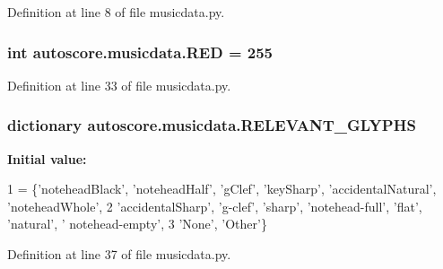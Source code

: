 Definition at line 8 of file musicdata.\+py.

\subsubsection[{\texorpdfstring{R\+ED}{RED}}]{\setlength{\rightskip}{0pt plus 5cm}int autoscore.\+musicdata.\+R\+ED = 255}\hypertarget{namespaceautoscore_1_1musicdata_a8bdc2ab9668f34c2e203c42365bf9047}{}\label{namespaceautoscore_1_1musicdata_a8bdc2ab9668f34c2e203c42365bf9047}


Definition at line 33 of file musicdata.\+py.

\subsubsection[{\texorpdfstring{R\+E\+L\+E\+V\+A\+N\+T\+\_\+\+G\+L\+Y\+P\+HS}{RELEVANT_GLYPHS}}]{\setlength{\rightskip}{0pt plus 5cm}dictionary autoscore.\+musicdata.\+R\+E\+L\+E\+V\+A\+N\+T\+\_\+\+G\+L\+Y\+P\+HS}\hypertarget{namespaceautoscore_1_1musicdata_a2d30a65a367d3fd398938b3d45c9dcab}{}\label{namespaceautoscore_1_1musicdata_a2d30a65a367d3fd398938b3d45c9dcab}
{\bfseries Initial value\+:}
\begin{DoxyCode}
1 = \{\textcolor{stringliteral}{'noteheadBlack'}, \textcolor{stringliteral}{'noteheadHalf'}, \textcolor{stringliteral}{'gClef'}, \textcolor{stringliteral}{'keySharp'}, \textcolor{stringliteral}{'accidentalNatural'}, \textcolor{stringliteral}{'noteheadWhole'},
2                    \textcolor{stringliteral}{'accidentalSharp'}, \textcolor{stringliteral}{'g-clef'}, \textcolor{stringliteral}{'sharp'}, \textcolor{stringliteral}{'notehead-full'}, \textcolor{stringliteral}{'flat'}, \textcolor{stringliteral}{'natural'}, \textcolor{stringliteral}{'
      notehead-empty'},
3                    \textcolor{stringliteral}{'None'}, \textcolor{stringliteral}{'Other'}\}
\end{DoxyCode}


Definition at line 37 of file musicdata.\+py.

